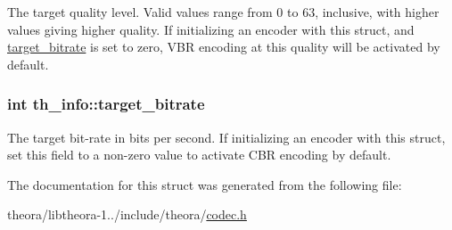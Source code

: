 The target quality level. Valid values range from 0 to 63, inclusive, with higher values giving higher quality. If initializing an encoder with this struct, and \hyperlink{structth__info_a1d9c8d768a4ae623269f5bd8f6f7a015}{target\+\_\+bitrate} is set to zero, V\+B\+R encoding at this quality will be activated by default. \hypertarget{structth__info_a1d9c8d768a4ae623269f5bd8f6f7a015}{
\subsubsection[{target\+\_\+bitrate}]{\setlength{\rightskip}{0pt plus 5cm}int th\+\_\+info\+::target\+\_\+bitrate}}\label{structth__info_a1d9c8d768a4ae623269f5bd8f6f7a015}
The target bit-\/rate in bits per second. If initializing an encoder with this struct, set this field to a non-\/zero value to activate C\+B\+R encoding by default. 

The documentation for this struct was generated from the following file\+:\begin{DoxyCompactItemize}
\item 
theora/libtheora-\/1../include/theora/\hyperlink{theora_2libtheora-1_81_81_2include_2theora_2codec_8h}{codec.\+h}\end{DoxyCompactItemize}
